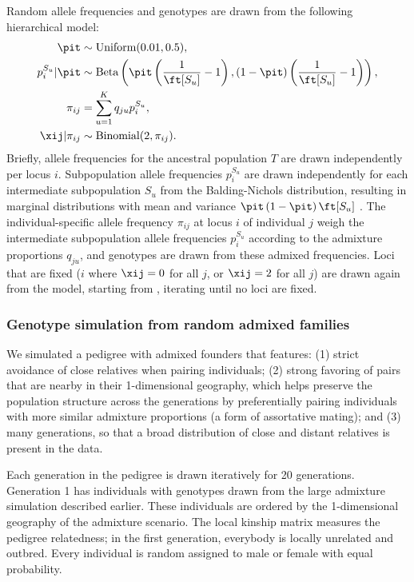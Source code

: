 \documentclass[11pt]{article}
\begin{document}
Random allele frequencies and genotypes are drawn from the following hierarchical model:
\begin{align*}
  \pit
  &\sim
    \text{Uniform}( 0.01, 0.5 )
    , \\
  p_i^{S_u} | \pit
  &\sim
    \text{Beta} \left(
    \pit \left( \frac{1}{ \ft[S_u] } - 1 \right),
    \left( 1 - \pit \right) \left( \frac{1}{ \ft[S_u] } - 1 \right)
    \right)
    , \\
  \pi_{ij}
  &=
    \sum_{u = 1}^K q_{ju} p_i^{S_u}
    , \\
  \xij | \pi_{ij}
  &\sim
    \text{Binomial}(2, \pi_{ij})
    .
\end{align*}
Briefly, allele frequencies \pit for the ancestral population $T$ are drawn independently per locus $i$.
Subpopulation allele frequencies $p_i^{S_u}$ are drawn independently for each intermediate subpopulation $S_u$ from the Balding-Nichols distribution, resulting in marginal distributions with mean \pit and variance $\pit \left( 1 - \pit \right) \ft[S_u]$ \citep{balding_method_1995}.
The individual-specific allele frequency $\pi_{ij}$ at locus $i$ of individual $j$ weigh the intermediate subpopulation allele frequencies $p_i^{S_u}$ according to the admixture proportions $q_{ju}$, and genotypes are drawn from these admixed frequencies.
Loci that are fixed ($i$ where $\xij = 0$ for all $j$, or $\xij = 2$ for all $j$) are drawn again from the model, starting from \pit, iterating until no loci are fixed.

\subsubsection{Genotype simulation from random admixed families}

We simulated a pedigree with admixed founders that features:
(1) strict avoidance of close relatives when pairing individuals;
(2) strong favoring of pairs that are nearby in their 1-dimensional geography, which helps preserve the population structure across the generations by preferentially pairing individuals with more similar admixture proportions (a form of assortative mating); and
(3) many generations, so that a broad distribution of close and distant relatives is present in the data.

Each generation in the pedigree is drawn iteratively for 20 generations.
Generation 1 has individuals with genotypes drawn from the large admixture simulation described earlier.
These individuals are ordered by the 1-dimensional geography of the admixture scenario.
The local kinship matrix measures the pedigree relatedness; in the first generation, everybody is locally unrelated and outbred.
Every individual is random assigned to male or female with equal probability.
\end{document}
